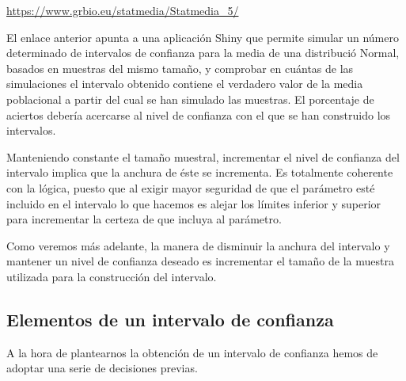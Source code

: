\documentclass[
]{article}
\begin{document}
\url{https://www.grbio.eu/statmedia/Statmedia_5/}

El enlace anterior apunta a una aplicación Shiny que permite simular un número determinado de intervalos de confianza para la media de una distribució Normal, basados en muestras del mismo tamaño, y comprobar en cuántas de las simulaciones el intervalo obtenido contiene el verdadero valor de la media poblacional a partir del cual se han simulado las muestras. El porcentaje de aciertos debería acercarse al nivel de confianza con el que se han construido los intervalos.

Manteniendo constante el tamaño muestral, incrementar el nivel de confianza del intervalo implica que la anchura de éste se incrementa. Es totalmente coherente con la lógica, puesto que al exigir mayor seguridad de que el parámetro esté incluido en el intervalo lo que hacemos es alejar los límites inferior y superior para incrementar la certeza de que incluya al parámetro.

Como veremos más adelante, la manera de disminuir la anchura del intervalo y mantener un nivel de confianza deseado es incrementar el tamaño de la muestra utilizada para la construcción del intervalo.

\subsection{Elementos de un intervalo de confianza}\label{elementos-de-un-intervalo-de-confianza}

A la hora de plantearnos la obtención de un intervalo de confianza hemos de adoptar una serie de decisiones previas.
\end{document}
